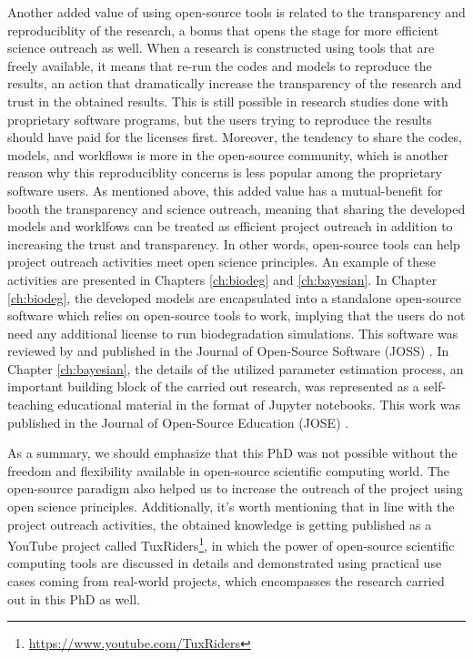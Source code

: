 Another added value of using open-source tools is related to the transparency and reproduciblity of the research, a bonus that opens the stage for more efficient science outreach as well. When a research is constructed using tools that are freely available, it means that re-run the codes and models to reproduce the results, an action that dramatically increase the transparency of the research and trust in the obtained results. This is still possible in research studies done with proprietary software programs, but the users trying to reproduce the results should have paid for the licenses first. Moreover, the tendency to share the codes, models, and workflows is more in the open-source community, which is another reason why this reproduciblity concerns is less popular among the proprietary software users. As mentioned above, this added value has a mutual-benefit for booth the transparency and science outreach, meaning that sharing the developed models and worklfows can be treated as efficient project outreach in addition to increasing the trust and transparency. In other words, open-source tools can help  project outreach activities meet open science principles. An example of these activities are presented in Chapters \ref{ch:biodeg} and \ref{ch:bayesian}. In Chapter \ref{ch:biodeg}, the developed models are encapsulated into a standalone open-source software which relies on open-source tools to work, implying that the users do not need any additional license to run biodegradation simulations. This software was reviewed by and published in the Journal of Open-Source Software (JOSS) \cite{Barzegari2022JOSS}. In Chapter \ref{ch:bayesian}, the details of the utilized parameter estimation process, an important building block of the carried out research, was represented as a self-teaching educational material in the format of Jupyter notebooks. This work was published in the Journal of Open-Source Education (JOSE) \cite{Barzegari2021JOSE}. 

As a summary, we should emphasize that this PhD was not possible without the freedom and flexibility available in open-source scientific computing world. The open-source paradigm also helped us to increase the outreach of the project using open science principles. Additionally, it's worth mentioning that in line with the project outreach activities, the obtained knowledge is getting published as a YouTube project called TuxRiders\footnote{\url{https://www.youtube.com/TuxRiders}}, in which the power of open-source scientific computing tools are discussed in details and demonstrated using practical use cases coming from real-world projects, which encompasses the research carried out in this PhD as well.



